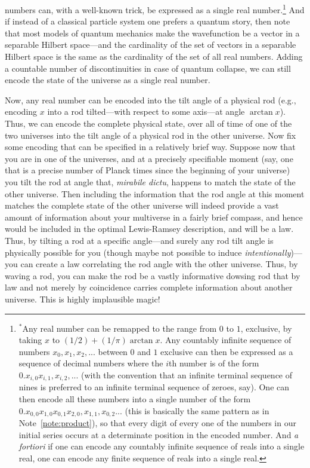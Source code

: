numbers can, with a well-known trick, be expressed as a single real number.\footnote{\label{note:seq}$^*$Any real number can be remapped to the range
from $0$ to $1$, exclusive, by taking $x$ to $(1/2)+(1/\pi)\arctan x$. Any countably infinite sequence of numbers $x_0,x_1,x_2,...$ between $0$ and $1$ 
exclusive can then be expressed as a sequence of decimal numbers where the $i$th number is of the form $0.x_{i,0}x_{i,1},x_{i,2},...$ (with 
the convention that an infinite terminal sequence of nines is preferred to an infinite terminal sequence of zeroes, say). One can then 
encode all these numbers into a single number of the form 
$0.x_{0,0}x_{1,0}x_{0,1}x_{2,0},x_{1,1},x_{0,2}...$ (this is basically the same pattern as in Note~\ref{note:product}), so that every
digit of every one of the numbers in our initial series occurs at a determinate position in the encoded number. And \textit{a fortiori}
if one can encode any countably infinite sequence of reals into a single real, one can encode any finite sequence of reals into a single
real.} And if instead of a classical particle system one prefers a quantum story, then note that most models of quantum mechanics make 
the wavefunction be a vector in a separable Hilbert space---and the cardinality of the set of vectors in a separable Hilbert space is the 
same as the cardinality of the set of all real numbers. Adding a countable number of discontinuities in case of quantum collapse, we can still
encode the state of the universe as a single real number.

Now, any real number can be encoded into the tilt angle of a physical rod (e.g., encoding $x$ into a rod tilted---with respect to some
axis---at angle $\arctan x$). Thus, we can encode the complete physical state, over all of time of one of the two universes into the tilt angle of a physical rod
in the other universe. Now fix some encoding that can be specified in a relatively brief way. Suppose now that you are in one of the 
universes, and at a precisely specifiable moment (say, one that is a precise number of Planck times since the beginning of your universe)
you tilt the rod at angle that, \textit{mirabile dictu}, happens to match the state of the other universe. Then including the information that the 
rod angle at this moment matches the complete state of the other universe will indeed provide a vast amount of information about your 
multiverse in a fairly brief compass, and hence would be included in the optimal Lewis-Ramsey description, and will be a law. Thus, by
tilting a rod at a specific angle---and surely any rod tilt angle is physically possible for you (though maybe not possible to induce
\textit{intentionally})---you can create a law correlating the rod angle with the other universe. Thus, by waving a rod, you can make
the rod be a vastly informative dowsing rod that by law and not merely by coincidence carries complete information about another universe.
This is highly implausible magic!

